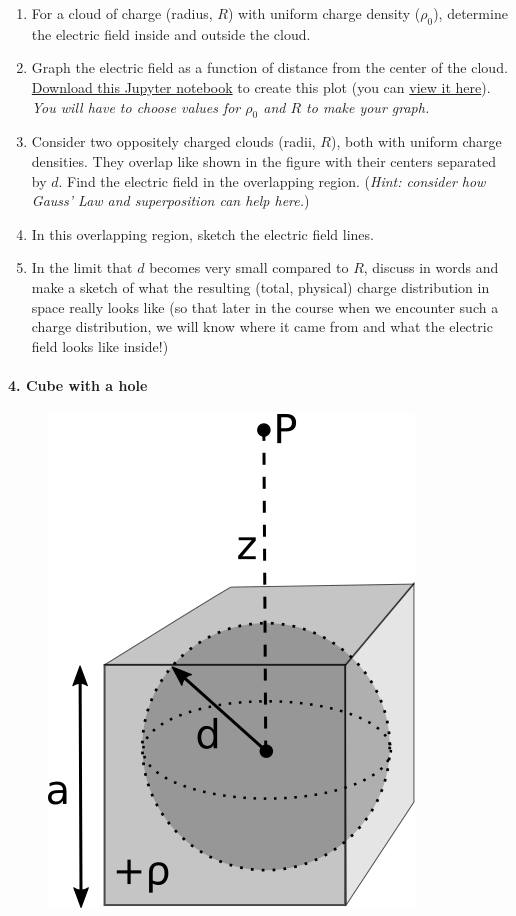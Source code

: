 \documentclass[11pt]{article}
\def\tightlist{}
\begin{document}
\begin{enumerate}
\def\labelenumi{\arabic{enumi}.}
\tightlist
\item
  For a cloud of charge (radius, \(R\)) with uniform charge density
  (\(\rho_0\)), determine the electric field inside and outside the
  cloud.
\item
  Graph the electric field as a function of distance from the center of
  the cloud. \href{../jupyter/HW3-LinePlotting.ipynb}{Download this
  Jupyter notebook} to create this plot (you can
  \href{https://github.com/dannycab/phy481msu/blob/gh-pages/jupyter/HW3-LinePlotting.ipynb}{view
  it here}). \emph{You will have to choose values for \(\rho_0\) and
  \(R\) to make your graph.}
\item
  Consider two oppositely charged clouds (radii, \(R\)), both with
  uniform charge densities. They overlap like shown in the figure with
  their centers separated by \(d\). Find the electric field in the
  overlapping region. (\emph{Hint: consider how Gauss' Law and
  superposition can help here.})
\item
  In this overlapping region, sketch the electric field lines.
\item
  In the limit that \(d\) becomes very small compared to \(R\), discuss
  in words and make a sketch of what the resulting (total, physical)
  charge distribution in space really looks like (so that later in the
  course when we encounter such a charge distribution, we will know
  where it came from and what the electric field looks like inside!)
\end{enumerate}

\paragraph{4. Cube with a hole}\label{cube-with-a-hole}

\begin{figure}[htbp]
\centering
\includegraphics[width=0.4\linewidth]{./images/hw3/cube_w_hole.png}
\end{figure}
\end{document}
